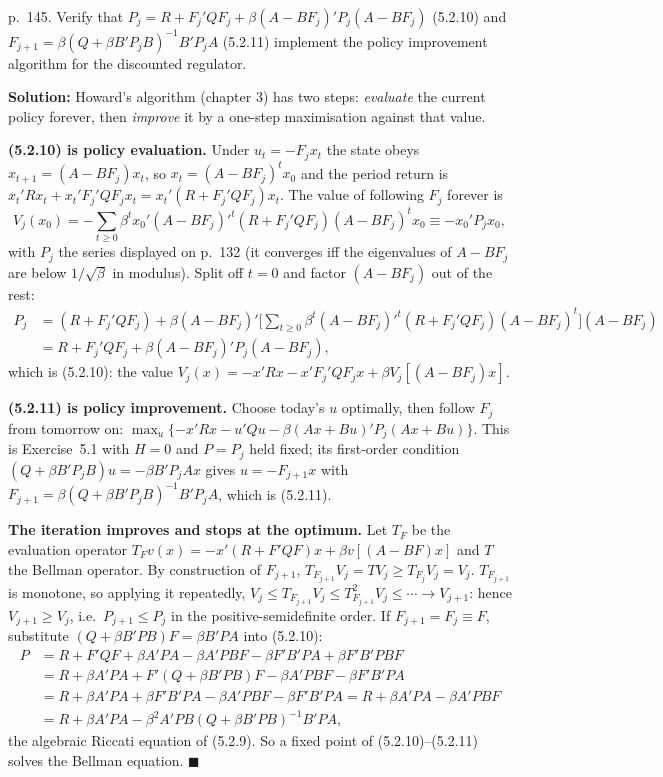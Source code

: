 \documentclass[12pt, letterpaper]{article}
\begin{document}
\begin{tcolorbox}[evenbox,title={Exercise 5.2 \quad (5.2.10)--(5.2.11) are the policy improvement algorithm}]
\begin{tcolorbox}[questionbox]
p.~145. Verify that $P_j=R+F_j'QF_j+\beta(A-BF_j)'P_j(A-BF_j)$ (5.2.10) and
$F_{j+1}=\beta(Q+\beta B'P_jB)^{-1}B'P_jA$ (5.2.11) implement the policy improvement algorithm for the
discounted regulator.
\end{tcolorbox}

\textbf{Solution:} Howard's algorithm (chapter 3) has two steps: \emph{evaluate} the current
policy forever, then \emph{improve} it by a one-step maximisation against that value.

\textbf{(5.2.10) is policy evaluation.} Under $u_t=-F_jx_t$ the state obeys
$x_{t+1}=(A-BF_j)x_t$, so $x_t=(A-BF_j)^tx_0$ and the period return is
$x_t'Rx_t+x_t'F_j'QF_jx_t=x_t'(R+F_j'QF_j)x_t$. The value of following $F_j$ forever is
\[
V_j(x_0)=-\sum_{t\ge0}\beta^tx_0'(A-BF_j)'^t(R+F_j'QF_j)(A-BF_j)^tx_0\equiv-x_0'P_jx_0,
\]
with $P_j$ the series displayed on p.~132 (it converges iff the eigenvalues of $A-BF_j$ are below
$1/\sqrt\beta$ in modulus). Split off $t=0$ and factor $(A-BF_j)$ out of the rest:
\begin{align*}
P_j&=(R+F_j'QF_j)+\beta(A-BF_j)'\Big[\sum_{t\ge0}\beta^t(A-BF_j)'^t(R+F_j'QF_j)(A-BF_j)^t\Big](A-BF_j)\\
&=R+F_j'QF_j+\beta(A-BF_j)'P_j(A-BF_j),
\end{align*}
which is (5.2.10): the value $V_j(x)=-x'Rx-x'F_j'QF_jx+\beta V_j[(A-BF_j)x]$.

\textbf{(5.2.11) is policy improvement.} Choose today's $u$ optimally, then follow $F_j$ from
tomorrow on:
$\max_u\{-x'Rx-u'Qu-\beta(Ax+Bu)'P_j(Ax+Bu)\}$. This is Exercise~5.1 with $H=0$ and $P=P_j$ held
fixed; its first-order condition $(Q+\beta B'P_jB)u=-\beta B'P_jAx$ gives
$u=-F_{j+1}x$ with $F_{j+1}=\beta(Q+\beta B'P_jB)^{-1}B'P_jA$, which is (5.2.11).

\textbf{The iteration improves and stops at the optimum.} Let $T_F$ be the evaluation operator
$T_Fv(x)=-x'(R+F'QF)x+\beta v[(A-BF)x]$ and $T$ the Bellman operator. By construction of $F_{j+1}$,
$T_{F_{j+1}}V_j=TV_j\ge T_{F_j}V_j=V_j$. $T_{F_{j+1}}$ is monotone, so applying it repeatedly,
$V_j\le T_{F_{j+1}}V_j\le T^2_{F_{j+1}}V_j\le\cdots\to V_{j+1}$: hence $V_{j+1}\ge V_j$, i.e.\
$P_{j+1}\le P_j$ in the positive-semidefinite order. If $F_{j+1}=F_j\equiv F$, substitute
$(Q+\beta B'PB)F=\beta B'PA$ into (5.2.10):
\begin{align*}
P&=R+F'QF+\beta A'PA-\beta A'PBF-\beta F'B'PA+\beta F'B'PBF\\
&=R+\beta A'PA+F'(Q+\beta B'PB)F-\beta A'PBF-\beta F'B'PA\\
&=R+\beta A'PA+\beta F'B'PA-\beta A'PBF-\beta F'B'PA
 =R+\beta A'PA-\beta A'PBF\\
&=R+\beta A'PA-\beta^2A'PB(Q+\beta B'PB)^{-1}B'PA,
\end{align*}
the algebraic Riccati equation of (5.2.9). So a fixed point of (5.2.10)--(5.2.11) solves the
Bellman equation. \hfill$\blacksquare$


\end{tcolorbox}
\end{document}

